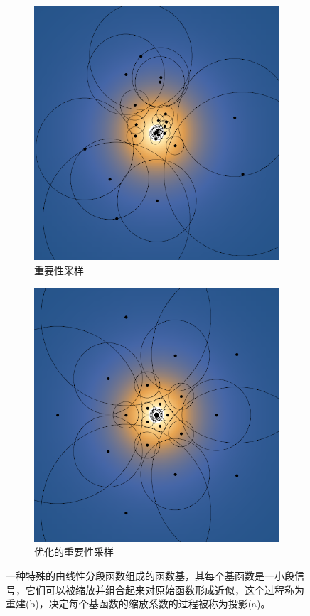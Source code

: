 \begin{figure}
\begin{subfigure}[b]{0.325\textwidth}
		\includegraphics[width=\textwidth]{figures/pl/sampling-importance}
			\caption{重要性采样}
	\end{subfigure}
	\begin{subfigure}[b]{0.325\textwidth}
		\includegraphics[width=\textwidth]{figures/pl/sampling-optimized}
			\caption{优化的重要性采样}
	\end{subfigure}
	\caption{一种特殊的由线性分段函数组成的函数基，其每个基函数是一小段信号，它们可以被缩放并组合起来对原始函数形成近似，这个过程称为重建(b)，决定每个基函数的缩放系数的过程被称为投影(a)。}
	\label{f:pl-sampling-comparation}
\end{figure}




